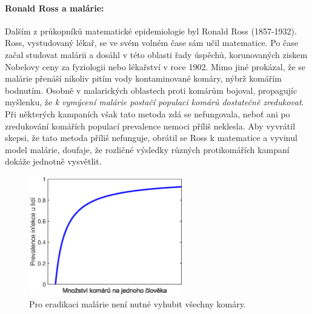 
\paragraph{Ronald Ross a malárie:} Dalším z průkopníků matematické epidemiologie byl Ronald Ross (1857-1932). Ross, vystudovaný lékař, se ve svém volném čase sám učil matematice. Po čase začal studovat malárii a dosáhl v této oblasti řady úspěchů, korunovaných ziskem Nobelovy ceny za fyziologii nebo lékařství v roce 1902. Mimo jiné prokázal, že se malárie přenáší nikoliv pitím vody kontaminované komáry, nýbrž komářím bodnutím. Osobně v malarických oblastech proti komárům bojoval, propagujíc myšlenku, že \emph{k vymýcení malárie postačí populaci komárů dostatečně zredukovat}. Při některých kampaních však tato metoda zdá se nefungovala, neboť ani po zredukování komářích populací prevalence nemoci příliš neklesla. Aby vyvrátil skepsi, že tato metoda příliš nefunguje, obrátil se Ross k matematice a vyvinul model malárie, doufaje, že rozličné výsledky různých protikomářích kampaní dokáže jednotně vysvětlit. 

\begin{figure}[h]
\begin{center}
	\includegraphics[width=0.6\textwidth]{pic/ross_plot.eps}
\end{center}
\caption{Pro eradikaci malárie není nutné vyhubit všechny komáry.}
\label{ross1}
\end{figure}

